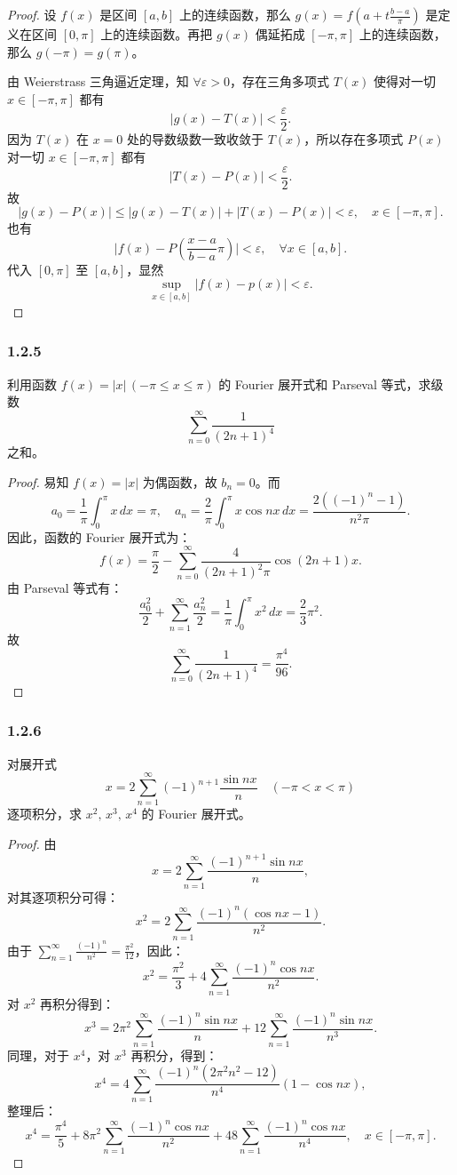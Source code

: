 \documentclass[12pt]{ctexart}
\begin{document}
\begin{proof}
设 $f(x)$ 是区间 $[a, b]$ 上的连续函数，那么 $g(x) = f(a + t\frac{b-a}{\pi})$ 是定义在区间 $[0, \pi]$ 上的连续函数。再把 $g(x)$ 偶延拓成 $[-\pi, \pi]$ 上的连续函数，那么 $g(-\pi) = g(\pi)$。

由 Weierstrass 三角逼近定理，知 $\forall \varepsilon > 0$，存在三角多项式 $T(x)$ 使得对一切 $x \in [-\pi, \pi]$ 都有
\[
\lvert g(x) - T(x) \rvert < \frac{\varepsilon}{2}.
\]
因为 $T(x)$ 在 $x=0$ 处的导数级数一致收敛于 $T(x)$，所以存在多项式 $P(x)$ 对一切 $x \in [-\pi, \pi]$ 都有
\[
\lvert T(x) - P(x) \rvert < \frac{\varepsilon}{2}.
\]
故
\[
\lvert g(x) - P(x) \rvert \leq \lvert g(x) - T(x) \rvert + \lvert T(x) - P(x) \rvert < \varepsilon, \quad x \in [-\pi, \pi].
\]
也有
\[
\lvert f(x) - P(\frac{x-a}{b-a}\pi) \rvert < \varepsilon, \quad \forall x \in [a, b].
\]
代入 $[0, \pi]$ 至 $[a, b]$，显然
\[
\sup_{x \in [a, b]} \lvert f(x) - p(x) \rvert < \varepsilon.
\]
\end{proof}

\subsubsection*{1.2.5}
利用函数 $f(x) = \lvert x \rvert \, (-\pi \leq x \leq \pi)$ 的 Fourier 展开式和 Parseval 等式，求级数
\[
\sum_{n=0}^\infty \frac{1}{(2n+1)^4}
\]
之和。

\begin{proof}
易知 $f(x) = |x|$ 为偶函数，故 $b_n = 0$。而
\[
a_0 = \frac{1}{\pi} \int_0^\pi x \, dx = \pi, \quad 
a_n = \frac{2}{\pi} \int_0^\pi x \cos nx \, dx = \frac{2((-1)^n - 1)}{n^2 \pi}.
\]
因此，函数的 Fourier 展开式为：
\[
f(x) = \frac{\pi}{2} - \sum_{n=0}^\infty \frac{4}{(2n+1)^2 \pi} \cos(2n+1)x.
\]
由 Parseval 等式有：
\[
\frac{a_0^2}{2} + \sum_{n=1}^\infty \frac{a_n^2}{2} = \frac{1}{\pi} \int_0^\pi x^2 \, dx = \frac{2}{3} \pi^2.
\]
故
\[
\sum_{n=0}^\infty \frac{1}{(2n+1)^4} = \frac{\pi^4}{96}.
\]
\end{proof}

\subsubsection*{1.2.6}
对展开式
\[
x = 2 \sum_{n=1}^\infty (-1)^{n+1} \frac{\sin nx}{n} \quad (-\pi < x < \pi)
\]
逐项积分，求 $x^2, \, x^3, \, x^4$ 的 Fourier 展开式。

\begin{proof}
由
\[
x = 2 \sum_{n=1}^\infty \frac{(-1)^{n+1} \sin nx}{n},
\]
对其逐项积分可得：
\[
x^2 = 2 \sum_{n=1}^\infty \frac{(-1)^{n} (\cos nx - 1)}{n^2}.
\]
由于 $\sum_{n=1}^\infty \frac{(-1)^n}{n^2} = \frac{\pi^2}{12}$，因此：
\[
x^2 = \frac{\pi^2}{3} + 4 \sum_{n=1}^\infty \frac{(-1)^n \cos nx}{n^2}.
\]
对 $x^2$ 再积分得到：
\[
x^3 = 2\pi^2 \sum_{n=1}^\infty \frac{(-1)^n \sin nx}{n} + 12 \sum_{n=1}^\infty \frac{(-1)^n \sin nx}{n^3}.
\]
同理，对于 $x^4$，对 $x^3$ 再积分，得到：
\[
x^4 = 4 \sum_{n=1}^\infty \frac{(-1)^n (2\pi^2 n^2 - 12)}{n^4} (1 - \cos nx),
\]
整理后：
\[
x^4 = \frac{\pi^4}{5} + 8\pi^2 \sum_{n=1}^\infty \frac{(-1)^n \cos nx}{n^2} + 48 \sum_{n=1}^\infty \frac{(-1)^n \cos nx}{n^4}, \quad x \in [-\pi, \pi].
\]
\end{proof}
\end{document}
